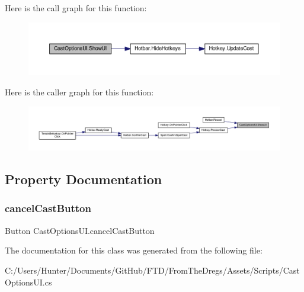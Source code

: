 Here is the call graph for this function\+:
\nopagebreak
\begin{figure}[H]
\begin{center}
\leavevmode
\includegraphics[width=350pt]{class_cast_options_u_i_a37c4fa85c666ede5418cd5d7e524ce35_cgraph}
\end{center}
\end{figure}
Here is the caller graph for this function\+:
\nopagebreak
\begin{figure}[H]
\begin{center}
\leavevmode
\includegraphics[width=350pt]{class_cast_options_u_i_a37c4fa85c666ede5418cd5d7e524ce35_icgraph}
\end{center}
\end{figure}


\subsection{Property Documentation}
\mbox{\label{class_cast_options_u_i_a88e0c5e435183c0f3912bd9eb5a6629f}} 
\subsubsection{\texorpdfstring{cancelCastButton}{cancelCastButton}}
{\footnotesize\ttfamily Button Cast\+Options\+U\+I.\+cancel\+Cast\+Button\hspace{0.3cm}{\ttfamily [get]}}



The documentation for this class was generated from the following file\+:\begin{DoxyCompactItemize}
\item 
C\+:/\+Users/\+Hunter/\+Documents/\+Git\+Hub/\+F\+T\+D/\+From\+The\+Dregs/\+Assets/\+Scripts/Cast\+Options\+U\+I.\+cs\end{DoxyCompactItemize}
